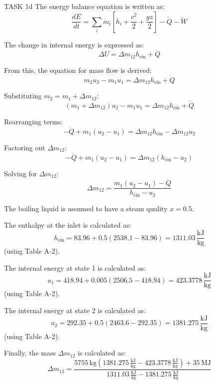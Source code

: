 TASK 1d  
The energy balance equation is written as:  
\[
\frac{dE}{dt} = \sum_i \dot{m}_i \left[ h_i + \frac{c^2}{2} + \frac{g z}{2} \right] - \dot{Q} - \dot{W}
\]

The change in internal energy is expressed as:  
\[
\Delta U = \Delta m_{12} h_{\text{ein}} + \dot{Q}
\]

From this, the equation for mass flow is derived:  
\[
m_2 u_2 - m_1 u_1 = \Delta m_{12} h_{\text{ein}} + \dot{Q}
\]

Substituting \( m_2 = m_1 + \Delta m_{12} \):  
\[
(m_1 + \Delta m_{12}) u_2 - m_1 u_1 = \Delta m_{12} h_{\text{ein}} + \dot{Q}
\]

Rearranging terms:  
\[
-\dot{Q} + m_1 (u_2 - u_1) = \Delta m_{12} h_{\text{ein}} - \Delta m_{12} u_2
\]

Factoring out \( \Delta m_{12} \):  
\[
-\dot{Q} + m_1 (u_2 - u_1) = \Delta m_{12} (h_{\text{ein}} - u_2)
\]

Solving for \( \Delta m_{12} \):  
\[
\Delta m_{12} = \frac{m_1 (u_2 - u_1) - \dot{Q}}{h_{\text{ein}} - u_2}
\]

The boiling liquid is assumed to have a steam quality \( x = 0.5 \).  

The enthalpy at the inlet is calculated as:  
\[
h_{\text{ein}} = 83.96 + 0.5 (2538.1 - 83.96) = 1311.03 \, \frac{\text{kJ}}{\text{kg}}
\]
(using Table A-2).  

The internal energy at state 1 is calculated as:  
\[
u_1 = 418.94 + 0.005 (2506.5 - 418.94) = 423.3778 \, \frac{\text{kJ}}{\text{kg}}
\]
(using Table A-2).  

The internal energy at state 2 is calculated as:  
\[
u_2 = 292.35 + 0.5 (2463.6 - 292.35) = 1381.275 \, \frac{\text{kJ}}{\text{kg}}
\]
(using Table A-2).  

Finally, the mass \( \Delta m_{12} \) is calculated as:  
\[
\Delta m_{12} = \frac{5755 \, \text{kg} (1381.275 \, \frac{\text{kJ}}{\text{kg}} - 423.3778 \, \frac{\text{kJ}}{\text{kg}}) + 35 \, \text{MJ}}{1311.03 \, \frac{\text{kJ}}{\text{kg}} - 1381.275 \, \frac{\text{kJ}}{\text{kg}}}
\]
